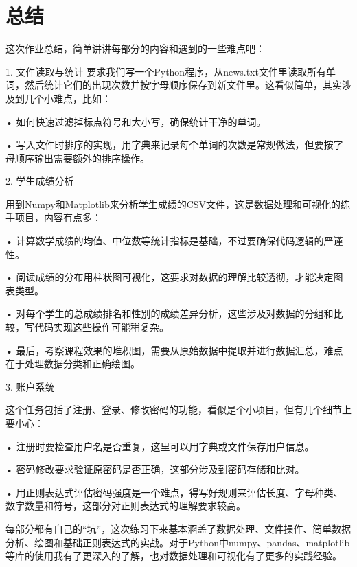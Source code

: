 \documentclass[12pt,a4paper,oneside]{article}
\begin{document}
\newpage
\section{总结}
这次作业总结，简单讲讲每部分的内容和遇到的一些难点吧：

	1.	文件读取与统计
要求我们写一个Python程序，从news.txt文件里读取所有单词，然后统计它们的出现次数并按字母顺序保存到新文件里。这看似简单，其实涉及到几个小难点，比如：
	
•	如何快速过滤掉标点符号和大小写，确保统计干净的单词。

•	写入文件时排序的实现，用字典来记录每个单词的次数是常规做法，但要按字母顺序输出需要额外的排序操作。

2.	学生成绩分析

用到Numpy和Matplotlib来分析学生成绩的CSV文件，这是数据处理和可视化的练手项目，内容有点多：

•	计算数学成绩的均值、中位数等统计指标是基础，不过要确保代码逻辑的严谨性。

•	阅读成绩的分布用柱状图可视化，这要求对数据的理解比较透彻，才能决定图表类型。

•	对每个学生的总成绩排名和性别的成绩差异分析，这些涉及对数据的分组和比较，写代码实现这些操作可能稍复杂。

•	最后，考察课程效果的堆积图，需要从原始数据中提取并进行数据汇总，难点在于处理数据分类和正确绘图。

3.	账户系统

这个任务包括了注册、登录、修改密码的功能，看似是个小项目，但有几个细节上要小心：


•	注册时要检查用户名是否重复，这里可以用字典或文件保存用户信息。

•	密码修改要求验证原密码是否正确，这部分涉及到密码存储和比对。

•	用正则表达式评估密码强度是一个难点，得写好规则来评估长度、字母种类、数字数量和符号，这部分对正则表达式的理解要求较高。


每部分都有自己的“坑”，这次练习下来基本涵盖了数据处理、文件操作、简单数据分析、绘图和基础正则表达式的实战。对于Python中numpy、pandas、matplotlib等库的使用我有了更深入的了解，也对数据处理和可视化有了更多的实践经验。
\end{document}
